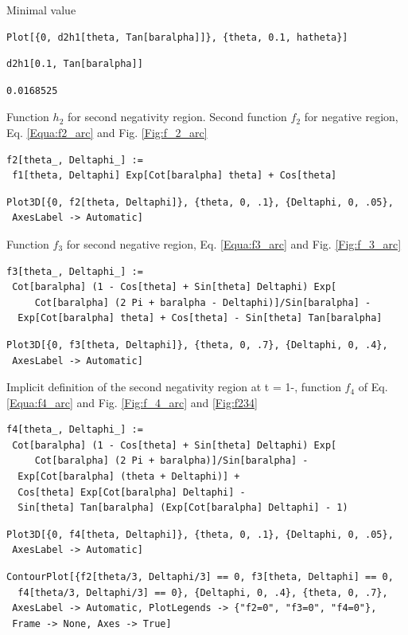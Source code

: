 \documentclass[reqno]{amsart}
\theoremstyle{definition} \newtheorem{definition}{Definition}[section]
\theoremstyle{definition} \newtheorem{remark}[definition]{Remark}
\theoremstyle{plain} \newtheorem{lemma}[definition]{Lemma}
\theoremstyle{plain} \newtheorem{proposition}[definition]{Proposition}
\theoremstyle{plain} \newtheorem{theorem}[definition]{Theorem}
\theoremstyle{plain} \newtheorem{corollary}[definition]{Corollary}
\theoremstyle{definition} \newtheorem{example}[definition]{Example}
\theoremstyle{plain} \newtheorem{claim}[clai]{Claim}
\theoremstyle{definition} \newtheorem{assumption}[definition]{Assumption}
\theoremstyle{definition} \newtheorem{observation}[definition]{Observation}
\newcommand{\1}{\mathbbm 1}
\newcommand{\smed}{\medskip}
\numberwithin{equation}{section} %
\theoremstyle{plain} \newtheorem*{theorem*}{Theorem}
\theoremstyle{plain} \newtheorem{mthm}[maintheorem]{Main Theorem}
\theoremstyle{plain} \newtheorem*{mthm*}{Main Theorem}
\theoremstyle{plain} \newtheorem*{conjecture*}{Conjecture}
\theoremstyle{plain} \newtheorem{conjecture}[definition]{Conjecture}
\theoremstyle{plain} \newtheorem*{problem*}{Problem}
\begin{document}
\smed
Minimal value
\smed
\begin{verbatim}
Plot[{0, d2h1[theta, Tan[baralpha]]}, {theta, 0.1, hatheta}]
\end{verbatim}
\begin{verbatim}
d2h1[0.1, Tan[baralpha]]
\end{verbatim}
\begin{verbatim}
0.0168525
\end{verbatim}
Function $h_2$ for second negativity region. Second function $f_2$ for negative region, Eq. \eqref{Equa:f2_arc} and Fig. \ref{Fig:f_2_arc}
\smed
\begin{verbatim}
f2[theta_, Deltaphi_] := 
 f1[theta, Deltaphi] Exp[Cot[baralpha] theta] + Cos[theta]
\end{verbatim}
\begin{verbatim}
Plot3D[{0, f2[theta, Deltaphi]}, {theta, 0, .1}, {Deltaphi, 0, .05}, 
 AxesLabel -> Automatic]
\end{verbatim}
\smed
Function $f_3$ for second negative region, Eq. \eqref{Equa:f3_arc} and Fig. \ref{Fig:f_3_arc}
\smed
\begin{verbatim}
f3[theta_, Deltaphi_] := 
 Cot[baralpha] (1 - Cos[theta] + Sin[theta] Deltaphi) Exp[
     Cot[baralpha] (2 Pi + baralpha - Deltaphi)]/Sin[baralpha] - 
  Exp[Cot[baralpha] theta] + Cos[theta] - Sin[theta] Tan[baralpha]
\end{verbatim}
\begin{verbatim}
Plot3D[{0, f3[theta, Deltaphi]}, {theta, 0, .7}, {Deltaphi, 0, .4}, 
 AxesLabel -> Automatic]
\end{verbatim}
\smed
Implicit definition of the second negativity region at t = 1-, function $f_4$ of Eq. \eqref{Equa:f4_arc} and Fig. \ref{Fig:f_4_arc} and \ref{Fig:f234}
\smed
\begin{verbatim}
f4[theta_, Deltaphi_] := 
 Cot[baralpha] (1 - Cos[theta] + Sin[theta] Deltaphi) Exp[
     Cot[baralpha] (2 Pi + baralpha)]/Sin[baralpha] - 
  Exp[Cot[baralpha] (theta + Deltaphi)] + 
  Cos[theta] Exp[Cot[baralpha] Deltaphi] - 
  Sin[theta] Tan[baralpha] (Exp[Cot[baralpha] Deltaphi] - 1)
\end{verbatim}
\begin{verbatim}
Plot3D[{0, f4[theta, Deltaphi]}, {theta, 0, .1}, {Deltaphi, 0, .05}, 
 AxesLabel -> Automatic]
\end{verbatim}
\begin{verbatim}
ContourPlot[{f2[theta/3, Deltaphi/3] == 0, f3[theta, Deltaphi] == 0, 
  f4[theta/3, Deltaphi/3] == 0}, {Deltaphi, 0, .4}, {theta, 0, .7}, 
 AxesLabel -> Automatic, PlotLegends -> {"f2=0", "f3=0", "f4=0"}, 
 Frame -> None, Axes -> True]
\end{verbatim}
\end{document}
